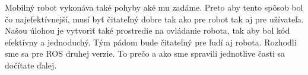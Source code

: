 Mobilný robot vykonáva také pohyby aké mu zadáme. Preto aby tento spôsob bol čo najefektívnejší, musí byť čitateľný dobre tak ako pre robot tak aj pre užívateľa.
Našou úlohou je vytvoriť také prostredie na ovládanie robota, tak aby bol kód efektívny a jednoduchý. Tým pádom bude čitateľný pre ľudí aj robota. Rozhodli sme
sa pre ROS druhej verzie. To prečo a ako sme spravili jednotlive časti sa dočítate ďalej.

